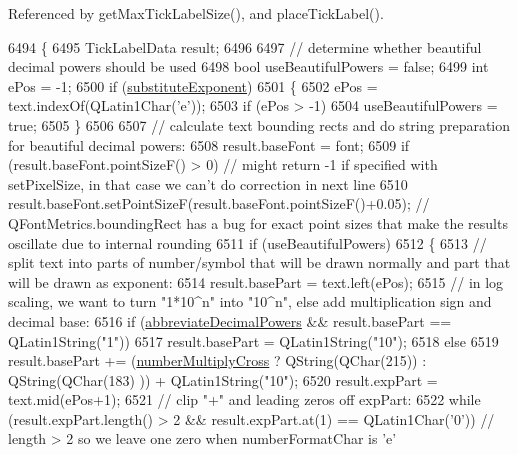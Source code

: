 Referenced by get\+Max\+Tick\+Label\+Size(), and place\+Tick\+Label().


\begin{DoxyCode}
6494 \{
6495   TickLabelData result;
6496   
6497   \textcolor{comment}{// determine whether beautiful decimal powers should be used}
6498   \textcolor{keywordtype}{bool} useBeautifulPowers = \textcolor{keyword}{false};
6499   \textcolor{keywordtype}{int} ePos = -1;
6500   \textcolor{keywordflow}{if} (\hyperlink{class_q_c_p_axis_painter_private_a546d22b10ddb5ca8582b7deb90223a91}{substituteExponent})
6501   \{
6502     ePos = text.indexOf(QLatin1Char(\textcolor{charliteral}{'e'}));
6503     \textcolor{keywordflow}{if} (ePos > -1)
6504       useBeautifulPowers = \textcolor{keyword}{true};
6505   \}
6506   
6507   \textcolor{comment}{// calculate text bounding rects and do string preparation for beautiful decimal powers:}
6508   result.baseFont = font;
6509   \textcolor{keywordflow}{if} (result.baseFont.pointSizeF() > 0) \textcolor{comment}{// might return -1 if specified with setPixelSize, in that case we
       can't do correction in next line}
6510     result.baseFont.setPointSizeF(result.baseFont.pointSizeF()+0.05); \textcolor{comment}{// QFontMetrics.boundingRect has a
       bug for exact point sizes that make the results oscillate due to internal rounding}
6511   \textcolor{keywordflow}{if} (useBeautifulPowers)
6512   \{
6513     \textcolor{comment}{// split text into parts of number/symbol that will be drawn normally and part that will be drawn as
       exponent:}
6514     result.basePart = text.left(ePos);
6515     \textcolor{comment}{// in log scaling, we want to turn "1*10^n" into "10^n", else add multiplication sign and decimal base:}
6516     \textcolor{keywordflow}{if} (\hyperlink{class_q_c_p_axis_painter_private_a68353c2eeabd00d96a2e36a0b3809cb2}{abbreviateDecimalPowers} && result.basePart == QLatin1String(\textcolor{stringliteral}{"1"}))
6517       result.basePart = QLatin1String(\textcolor{stringliteral}{"10"});
6518     \textcolor{keywordflow}{else}
6519       result.basePart += (\hyperlink{class_q_c_p_axis_painter_private_a0deb7524009140f00a774dfd286d002c}{numberMultiplyCross} ? QString(QChar(215)) : QString(QChar(183)
      )) + QLatin1String(\textcolor{stringliteral}{"10"});
6520     result.expPart = text.mid(ePos+1);
6521     \textcolor{comment}{// clip "+" and leading zeros off expPart:}
6522     \textcolor{keywordflow}{while} (result.expPart.length() > 2 && result.expPart.at(1) == QLatin1Char(\textcolor{charliteral}{'0'})) \textcolor{comment}{// length > 2 so we
       leave one zero when numberFormatChar is 'e'}

\end{DoxyCode}
